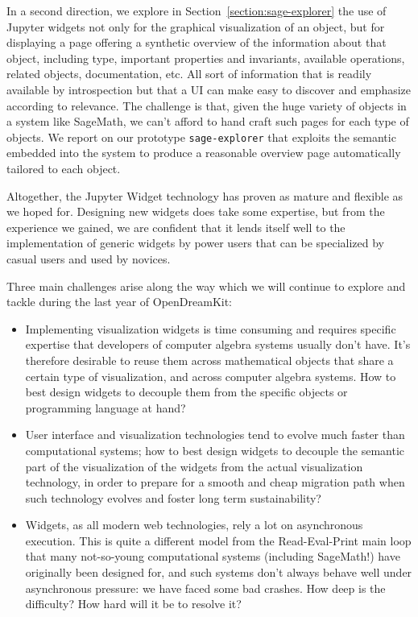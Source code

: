 \documentclass{deliverablereport}
\begin{document}
In a second direction, we explore in
Section~\ref{section:sage-explorer} the use of Jupyter widgets not only
for the graphical visualization of an object, but for displaying a
page offering a synthetic overview of the information about that
object, including type, important properties and invariants, available
operations, related objects, documentation, etc. All sort of
information that is readily available by introspection but that a UI
can make easy to discover and emphasize according to relevance. The
challenge is that, given the huge variety of objects in a system like
SageMath, we can't afford to hand craft such pages for each type of
objects. We report on our prototype
\lstinline{sage-explorer} that exploits the semantic embedded into the
system to produce a reasonable overview page automatically tailored to
each object.


Altogether, the Jupyter Widget technology has proven as mature and
flexible as we hoped for. Designing new widgets does take some
expertise, but from the experience we gained, we are confident that it
lends itself well to the implementation of generic widgets by power
users that can be specialized by casual users and used by novices.

Three main challenges arise along the way which we will continue to
explore and tackle during the last year of OpenDreamKit:
\begin{itemize}
\item Implementing visualization widgets is time consuming and
  requires specific expertise that developers of computer algebra
  systems usually don't have. It's therefore desirable to reuse them
  across mathematical objects that share a certain type of
  visualization, and across computer algebra systems. How to best
  design widgets to decouple them from the specific objects or
  programming language at hand?
\item User interface and visualization technologies tend to evolve
  much faster than computational systems; how to best design widgets
  to decouple the semantic part of the visualization of the widgets
  from the actual visualization technology, in order to prepare for a
  smooth and cheap migration path when such technology evolves and
  foster long term sustainability?
\item Widgets, as all modern web technologies, rely a lot on
  asynchronous execution. This is quite a different model from the
  Read-Eval-Print main loop that many not-so-young computational
  systems (including SageMath!) have originally been designed for, and
  such systems don't always behave well under asynchronous pressure:
  we have faced some bad crashes. How deep is the difficulty? How hard
  will it be to resolve it?
\end{itemize}
\end{document}
